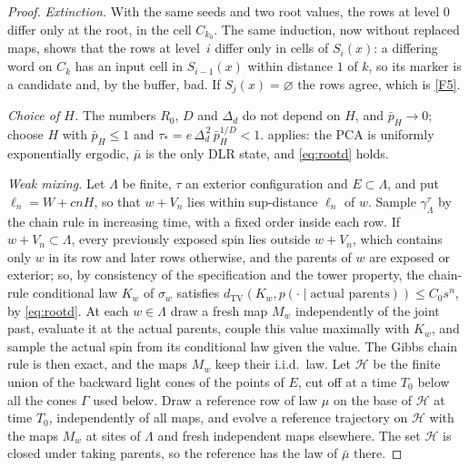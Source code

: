 \documentclass[11pt]{article}
\theoremstyle{plain}
\theoremstyle{definition}
\theoremstyle{remark}
\newcommand{\dtv}{d_{\mathrm{TV}}}
\newcommand{\Lam}{\Lambda}
\newcommand{\ba}{\bar{\mu}}
\begin{document}
\begin{proof}
\emph{Extinction.} With the same seeds and two root values, the rows at level $0$ differ only at the root, in the cell $C_{k_0}$. The same induction, now without replaced maps, shows that the rows at level~$i$ differ only in cells of $S_i(x)$: a differing word on $C_k$ has an input cell in $S_{i-1}(x)$ within distance $1$ of $k$, so its marker is a candidate and, by the buffer, bad. If $S_j(x)=\varnothing$ the rows agree, which is \ref{F5}.

\emph{Choice of $H$.} The numbers $R_0$, $D$ and $\Delta_d$ do not depend on $H$, and $\bar p_H\to0$; choose $H$ with $\bar p_H\le1$ and $\tau_*=e\,\Delta_d^{\,2}\,\bar p_H^{1/D}<1$.  applies: the PCA is uniformly exponentially ergodic, $\ba$ is the only DLR state, and \eqref{eq:rootd} holds.

\emph{Weak mixing.} Let $\Lam$ be finite, $\tau$ an exterior configuration and $E\subset\Lam$, and put $\ell_n=W+cnH$, so that $w+V_n$ lies within sup-distance $\ell_n$ of $w$. Sample $\gamma^\tau_\Lam$ by the chain rule in increasing time, with a fixed order inside each row. If $w+V_n\subset\Lam$, every previously exposed spin lies outside $w+V_n$, which contains only $w$ in its row and later rows otherwise, and the parents of $w$ are exposed or exterior; so, by consistency of the specification and the tower property, the chain-rule conditional law $K_w$ of $\sigma_w$ satisfies $\dtv(K_w,p(\cdot\mid\text{actual parents}))\le C_0s^n$, by \eqref{eq:rootd}. At each $w\in\Lam$ draw a fresh map $M_w$ independently of the joint past, evaluate it at the actual parents, couple this value maximally with $K_w$, and sample the actual spin from its conditional law given the value. The Gibbs chain rule is then exact, and the maps $M_w$ keep their i.i.d.\ law. Let $\mathcal H$ be the finite union of the backward light cones of the points of $E$, cut off at a time $T_0$ below all the cones $\Gamma$ used below. Draw a reference row of law $\mu$ on the base of $\mathcal H$ at time $T_0$, independently of all maps, and evolve a reference trajectory on $\mathcal H$ with the maps $M_w$ at sites of $\Lam$ and fresh independent maps elsewhere. The set $\mathcal H$ is closed under taking parents, so the reference has the law of $\ba$ there.


\end{proof}
\end{document}
